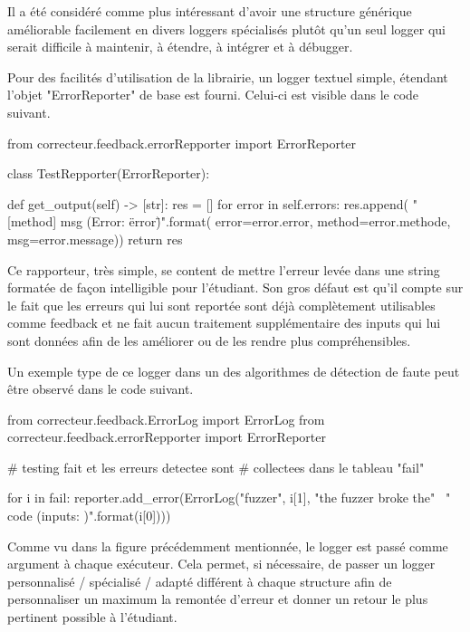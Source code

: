 \documentclass[a4paper]{report}
\begin{document}
Il a été considéré comme plus intéressant d'avoir une structure générique améliorable facilement en divers loggers spécialisés plutôt qu'un seul logger qui serait difficile à maintenir, à étendre, à intégrer et à débugger.


Pour des facilités d'utilisation de la librairie, un logger textuel simple, étendant l'objet "ErrorReporter" de base est fourni.
Celui-ci est visible dans le code suivant.


\begin{python}
from correcteur.feedback.errorRepporter import ErrorReporter


class TestRepporter(ErrorReporter):

    def get_output(self) -> [str]:
        res = []
        for error in self.errors:
            res.append(
                "[{method}] {msg} (Error: \"{error}\")".format(
                    error=error.error,
                    method=error.methode,
                    msg=error.message))
        return res
\end{python}

Ce rapporteur, très simple, se content de mettre l'erreur levée dans une string formatée de façon intelligible pour l'étudiant.
Son gros défaut est qu'il compte sur le fait que les erreurs qui lui sont reportée sont déjà complètement utilisables comme feedback et ne fait aucun traitement supplémentaire des inputs qui lui sont données afin de les améliorer ou de les rendre plus compréhensibles.


Un exemple type de ce logger dans un des algorithmes de détection de faute peut être observé dans le code suivant.

\begin{python}
from correcteur.feedback.ErrorLog import ErrorLog
from correcteur.feedback.errorRepporter import ErrorReporter

# testing fait et les erreurs detectee sont
# collectees dans le tableau "fail"

for i in fail:
	reporter.add_error(ErrorLog("fuzzer", i[1],
		"the fuzzer broke the" \
		" code  (inputs: {})".format(i[0])))
\end{python}



Comme vu dans la figure précédemment mentionnée, le logger est passé comme argument à chaque exécuteur.
Cela permet, si nécessaire, de passer un logger personnalisé / spécialisé / adapté différent à chaque structure afin de personnaliser un maximum la remontée d'erreur et donner un retour le plus pertinent possible à l'étudiant.
\end{document}
